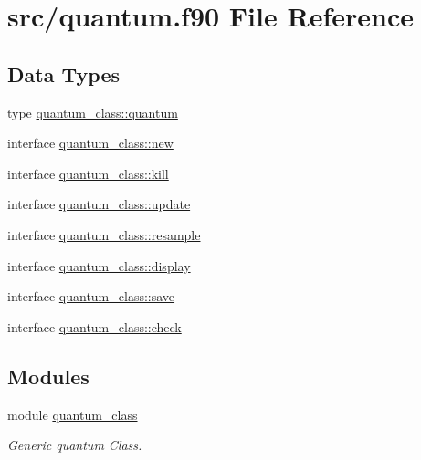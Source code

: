 \hypertarget{quantum_8f90}{}\section{src/quantum.f90 File Reference}
\label{quantum_8f90}
\subsection*{Data Types}
\begin{DoxyCompactItemize}
\item 
type \hyperlink{structquantum__class_1_1quantum}{quantum\+\_\+class\+::quantum}
\item 
interface \hyperlink{interfacequantum__class_1_1new}{quantum\+\_\+class\+::new}
\item 
interface \hyperlink{interfacequantum__class_1_1kill}{quantum\+\_\+class\+::kill}
\item 
interface \hyperlink{interfacequantum__class_1_1update}{quantum\+\_\+class\+::update}
\item 
interface \hyperlink{interfacequantum__class_1_1resample}{quantum\+\_\+class\+::resample}
\item 
interface \hyperlink{interfacequantum__class_1_1display}{quantum\+\_\+class\+::display}
\item 
interface \hyperlink{interfacequantum__class_1_1save}{quantum\+\_\+class\+::save}
\item 
interface \hyperlink{interfacequantum__class_1_1check}{quantum\+\_\+class\+::check}
\end{DoxyCompactItemize}
\subsection*{Modules}
\begin{DoxyCompactItemize}
\item 
module \hyperlink{namespacequantum__class}{quantum\+\_\+class}
\begin{DoxyCompactList}\small\item\em Generic quantum Class. \end{DoxyCompactList}\end{DoxyCompactItemize}
